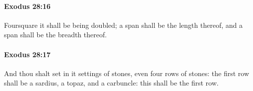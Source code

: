 		\paragraph{Exodus 28:16} %
			\label{EXODUS-28-16}

			Foursquare it shall be being doubled; a span shall be the length thereof, and a span shall be the breadth thereof.


		\paragraph{Exodus 28:17} %
			\label{EXODUS-28-17}

			And thou shalt set in it settings of stones, even four rows of stones: the first row shall be a sardius, a topaz, and a carbuncle: this shall be the first row.


